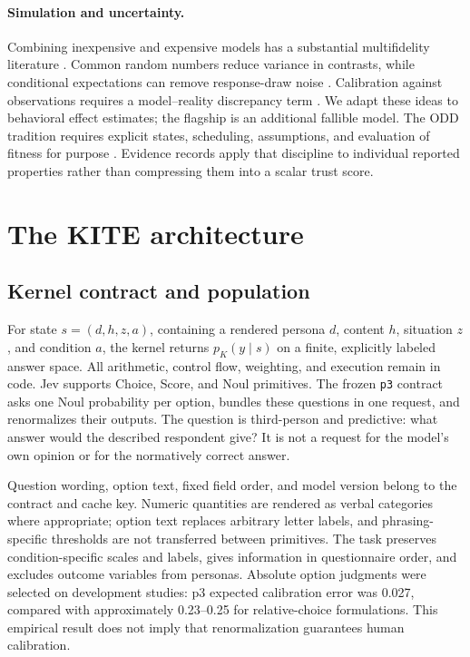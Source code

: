 \documentclass[11pt]{article}
\begin{document}
\paragraph{Simulation and uncertainty.}
Combining inexpensive and expensive models has a substantial multifidelity literature \citep{kennedy2000,peherstorfer2018}. Common random numbers reduce variance in contrasts, while conditional expectations can remove response-draw noise \citep{glasserman2004}. Calibration against observations requires a model--reality discrepancy term \citep{kennedy2001,brynjarsdottir2014}. We adapt these ideas to behavioral effect estimates; the flagship is an additional fallible model. The ODD tradition requires explicit states, scheduling, assumptions, and evaluation of fitness for purpose \citep{grimm2006,grimm2020}. Evidence records apply that discipline to individual reported properties rather than compressing them into a scalar trust score.

\section{The KITE architecture}
\subsection{Kernel contract and population}
For state $s=(d,h,z,a)$, containing a rendered persona $d$, content $h$, situation $z$, and condition $a$, the kernel returns $p_K(y\mid s)$ on a finite, explicitly labeled answer space. All arithmetic, control flow, weighting, and execution remain in code. Jev supports Choice, Score, and Noul primitives. The frozen \texttt{p3} contract asks one Noul probability per option, bundles these questions in one request, and renormalizes their outputs. The question is third-person and predictive: what answer would the described respondent give? It is not a request for the model's own opinion or for the normatively correct answer.

Question wording, option text, fixed field order, and model version belong to the contract and cache key. Numeric quantities are rendered as verbal categories where appropriate; option text replaces arbitrary letter labels, and phrasing-specific thresholds are not transferred between primitives. The task preserves condition-specific scales and labels, gives information in questionnaire order, and excludes outcome variables from personas. Absolute option judgments were selected on development studies: p3 expected calibration error was 0.027, compared with approximately 0.23--0.25 for relative-choice formulations. This empirical result does not imply that renormalization guarantees human calibration.
\end{document}
